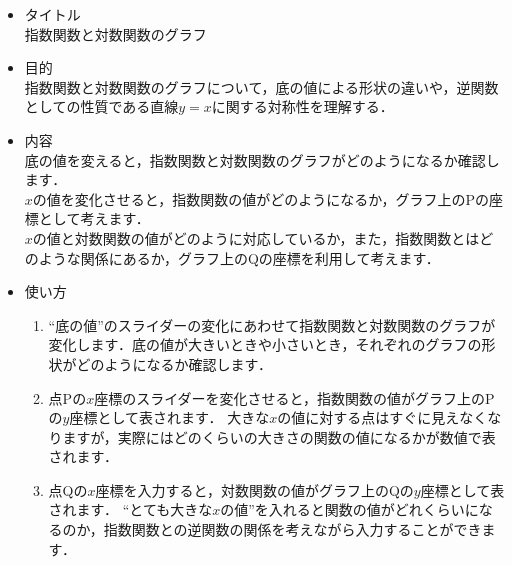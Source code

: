 \documentclass[10pt]{jarticle}
\begin{document}
\begin{itemize}
\item タイトル\\
指数関数と対数関数のグラフ

\item 目的\\
指数関数と対数関数のグラフについて，底の値による形状の違いや，逆関数としての性質である直線$y=x$に関する対称性を理解する．

\item 内容\\
底の値を変えると，指数関数と対数関数のグラフがどのようになるか確認します．\\
$x$の値を変化させると，指数関数の値がどのようになるか，グラフ上のPの座標として考えます．\\
$x$の値と対数関数の値がどのように対応しているか，また，指数関数とはどのような関係にあるか，グラフ上のQの座標を利用して考えます．

\item 使い方
\begin{enumerate}[(1)]
\item
``底の値''のスライダーの変化にあわせて指数関数と対数関数のグラフが変化します．底の値が大きいときや小さいとき，それぞれのグラフの形状がどのようになるか確認します．
\item
点Pの$x$座標のスライダーを変化させると，指数関数の値がグラフ上のPの$y$座標として表されます．
大きな$x$の値に対する点はすぐに見えなくなりますが，実際にはどのくらいの大きさの関数の値になるかが数値で表されます．
\item
点Qの$x$座標を入力すると，対数関数の値がグラフ上のQの$y$座標として表されます．
``とても大きな$x$の値''を入れると関数の値がどれくらいになるのか，指数関数との逆関数の関係を考えながら入力することができます．
\end{enumerate}
\end{itemize}
\end{document}
